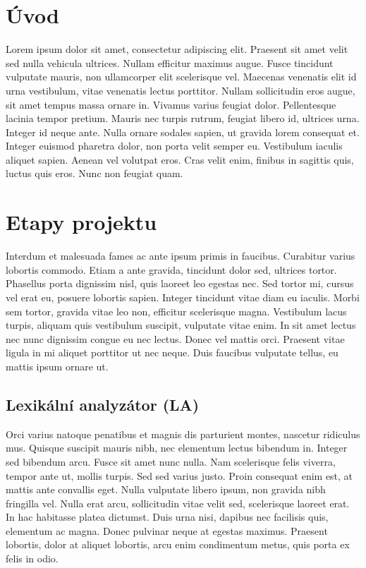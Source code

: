 \documentclass[11pt, a4paper]{article}
\begin{document}
\section{Úvod}
Lorem ipsum dolor sit amet, consectetur adipiscing elit. Praesent sit amet velit sed nulla vehicula ultrices. Nullam efficitur maximus augue. Fusce tincidunt vulputate mauris, non ullamcorper elit scelerisque vel. Maecenas venenatis elit id urna vestibulum, vitae venenatis lectus porttitor. Nullam sollicitudin eros augue, sit amet tempus massa ornare in. Vivamus varius feugiat dolor. Pellentesque lacinia tempor pretium. Mauris nec turpis rutrum, feugiat libero id, ultrices urna. Integer id neque ante. Nulla ornare sodales sapien, ut gravida lorem consequat et. Integer euismod pharetra dolor, non porta velit semper eu. Vestibulum iaculis aliquet sapien. Aenean vel volutpat eros. Cras velit enim, finibus in sagittis quis, luctus quis eros. Nunc non feugiat quam. 
\section{Etapy projektu}
Interdum et malesuada fames ac ante ipsum primis in faucibus. Curabitur varius lobortis commodo. Etiam a ante gravida, tincidunt dolor sed, ultrices tortor. Phasellus porta dignissim nisl, quis laoreet leo egestas nec. Sed tortor mi, cursus vel erat eu, posuere lobortis sapien. Integer tincidunt vitae diam eu iaculis. Morbi sem tortor, gravida vitae leo non, efficitur scelerisque magna. Vestibulum lacus turpis, aliquam quis vestibulum suscipit, vulputate vitae enim. In sit amet lectus nec nunc dignissim congue eu nec lectus. Donec vel mattis orci. Praesent vitae ligula in mi aliquet porttitor ut nec neque. Duis faucibus vulputate tellus, eu mattis ipsum ornare ut. 

\subsection{Lexikální analyzátor (LA)}
Orci varius natoque penatibus et magnis dis parturient montes, nascetur ridiculus mus. Quisque suscipit mauris nibh, nec elementum lectus bibendum in. Integer sed bibendum arcu. Fusce sit amet nunc nulla. Nam scelerisque felis viverra, tempor ante ut, mollis turpis. Sed sed varius justo. Proin consequat enim est, at mattis ante convallis eget. Nulla vulputate libero ipsum, non gravida nibh fringilla vel. Nulla erat arcu, sollicitudin vitae velit sed, scelerisque laoreet erat. In hac habitasse platea dictumst. Duis urna nisi, dapibus nec facilisis quis, elementum ac magna. Donec pulvinar neque at egestas maximus. Praesent lobortis, dolor at aliquet lobortis, arcu enim condimentum metus, quis porta ex felis in odio. 
\end{document}
